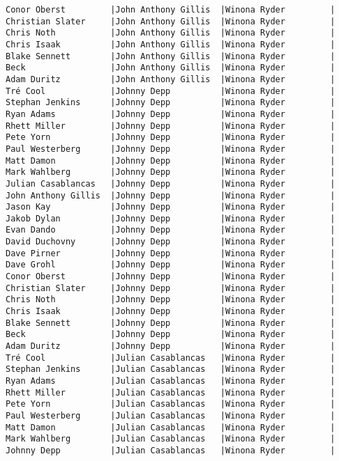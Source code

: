 \documentclass{article}
\begin{document}
\begin{verbatim}
Conor Oberst         |John Anthony Gillis  |Winona Ryder         |
Christian Slater     |John Anthony Gillis  |Winona Ryder         |
Chris Noth           |John Anthony Gillis  |Winona Ryder         |
Chris Isaak          |John Anthony Gillis  |Winona Ryder         |
Blake Sennett        |John Anthony Gillis  |Winona Ryder         |
Beck                 |John Anthony Gillis  |Winona Ryder         |
Adam Duritz          |John Anthony Gillis  |Winona Ryder         |
Tré Cool             |Johnny Depp          |Winona Ryder         |
Stephan Jenkins      |Johnny Depp          |Winona Ryder         |
Ryan Adams           |Johnny Depp          |Winona Ryder         |
Rhett Miller         |Johnny Depp          |Winona Ryder         |
Pete Yorn            |Johnny Depp          |Winona Ryder         |
Paul Westerberg      |Johnny Depp          |Winona Ryder         |
Matt Damon           |Johnny Depp          |Winona Ryder         |
Mark Wahlberg        |Johnny Depp          |Winona Ryder         |
Julian Casablancas   |Johnny Depp          |Winona Ryder         |
John Anthony Gillis  |Johnny Depp          |Winona Ryder         |
Jason Kay            |Johnny Depp          |Winona Ryder         |
Jakob Dylan          |Johnny Depp          |Winona Ryder         |
Evan Dando           |Johnny Depp          |Winona Ryder         |
David Duchovny       |Johnny Depp          |Winona Ryder         |
Dave Pirner          |Johnny Depp          |Winona Ryder         |
Dave Grohl           |Johnny Depp          |Winona Ryder         |
Conor Oberst         |Johnny Depp          |Winona Ryder         |
Christian Slater     |Johnny Depp          |Winona Ryder         |
Chris Noth           |Johnny Depp          |Winona Ryder         |
Chris Isaak          |Johnny Depp          |Winona Ryder         |
Blake Sennett        |Johnny Depp          |Winona Ryder         |
Beck                 |Johnny Depp          |Winona Ryder         |
Adam Duritz          |Johnny Depp          |Winona Ryder         |
Tré Cool             |Julian Casablancas   |Winona Ryder         |
Stephan Jenkins      |Julian Casablancas   |Winona Ryder         |
Ryan Adams           |Julian Casablancas   |Winona Ryder         |
Rhett Miller         |Julian Casablancas   |Winona Ryder         |
Pete Yorn            |Julian Casablancas   |Winona Ryder         |
Paul Westerberg      |Julian Casablancas   |Winona Ryder         |
Matt Damon           |Julian Casablancas   |Winona Ryder         |
Mark Wahlberg        |Julian Casablancas   |Winona Ryder         |
Johnny Depp          |Julian Casablancas   |Winona Ryder         |

\end{verbatim}
\end{document}
